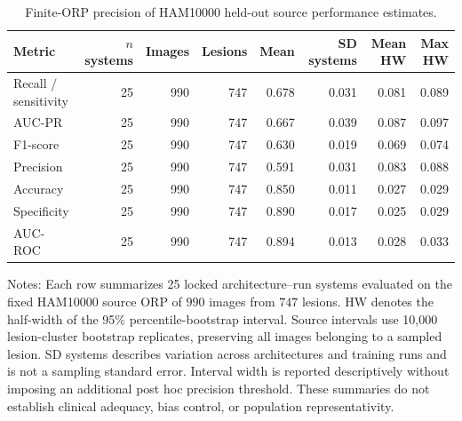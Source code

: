 \begin{table}[h!]
\centering
\scriptsize
\caption{Finite-ORP precision of HAM10000 held-out source performance estimates.}
\label{tab:source-pr-diagnostics}
\setlength{\tabcolsep}{3pt}
\renewcommand{\arraystretch}{1.08}
\begin{tabular}{lrrrrrrr}
\toprule
\textbf{Metric} & \textbf{$n$ systems} & \textbf{Images} & \textbf{Lesions} & \textbf{Mean} & \textbf{SD systems} & \textbf{Mean HW} & \textbf{Max HW} \\
\midrule
Recall / sensitivity & 25 & 990 & 747 & 0.678 & 0.031 & 0.081 & 0.089 \\
AUC-PR & 25 & 990 & 747 & 0.667 & 0.039 & 0.087 & 0.097 \\
F1-score & 25 & 990 & 747 & 0.630 & 0.019 & 0.069 & 0.074 \\
Precision & 25 & 990 & 747 & 0.591 & 0.031 & 0.083 & 0.088 \\
Accuracy & 25 & 990 & 747 & 0.850 & 0.011 & 0.027 & 0.029 \\
Specificity & 25 & 990 & 747 & 0.890 & 0.017 & 0.025 & 0.029 \\
AUC-ROC & 25 & 990 & 747 & 0.894 & 0.013 & 0.028 & 0.033 \\
\bottomrule
\end{tabular}
\begin{flushleft}
\footnotesize Notes: Each row summarizes 25 locked architecture--run systems evaluated on the fixed HAM10000 source ORP of $990$ images from $747$ lesions. HW denotes the half-width of the 95\% percentile-bootstrap interval. Source intervals use 10{,}000 lesion-cluster bootstrap replicates, preserving all images belonging to a sampled lesion. SD systems describes variation across architectures and training runs and is not a sampling standard error. Interval width is reported descriptively without imposing an additional post hoc precision threshold. These summaries do not establish clinical adequacy, bias control, or population representativity.
\end{flushleft}
\end{table}
